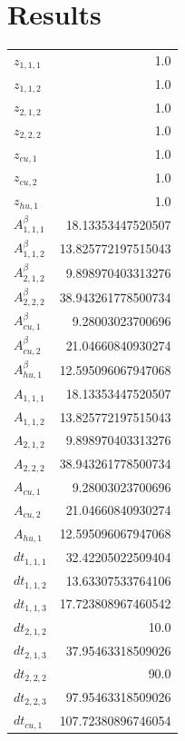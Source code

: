 \documentclass{article}%
\makeatletter
\let\mcnewpage=\newpage%
\newcommand{\TrickSupertabularIntoMulticols}{%
\renewcommand\newpage{%
\if@firstcolumn%
\hrule width\linewidth height0pt%
\columnbreak%
\else%
\mcnewpage%
\fi%
}%
}%
\makeatother
\begin{document}
\section{Results}%
\thispagestyle{plain}%
\begin{multicols*}{3}%
\TrickSupertabularIntoMulticols%
%
\begin{supertabular}{lr}%
	$z_{1,1,1}$ & 1.0 \\%
	$z_{1,1,2}$ & 1.0 \\%
	$z_{2,1,2}$ & 1.0 \\%
	$z_{2,2,2}$ & 1.0 \\%
	$z_{cu,1}$ & 1.0 \\%
	$z_{cu,2}$ & 1.0 \\%
	$z_{hu,1}$ & 1.0 \\%
	$A_{1,1,1}^{\beta}$ & 18.13353447520507 \\%
	$A_{1,1,2}^{\beta}$ & 13.825772197515043 \\%
	$A_{2,1,2}^{\beta}$ & 9.898970403313276 \\%
	$A_{2,2,2}^{\beta}$ & 38.943261778500734 \\%
	$A_{cu,1}^{\beta}$ & 9.28003023700696 \\%
	$A_{cu,2}^{\beta}$ & 21.04660840930274 \\%
	$A_{hu,1}^{\beta}$ & 12.595096067947068 \\%
	$A_{1,1,1}$ & 18.13353447520507 \\%
	$A_{1,1,2}$ & 13.825772197515043 \\%
	$A_{2,1,2}$ & 9.898970403313276 \\%
	$A_{2,2,2}$ & 38.943261778500734 \\%
	$A_{cu,1}$ & 9.28003023700696 \\%
	$A_{cu,2}$ & 21.04660840930274 \\%
	$A_{hu,1}$ & 12.595096067947068 \\%
	$dt_{1,1,1}$ & 32.42205022509404 \\%
	$dt_{1,1,2}$ & 13.63307533764106 \\%
	$dt_{1,1,3}$ & 17.723808967460542 \\%
	$dt_{2,1,2}$ & 10.0 \\%
	$dt_{2,1,3}$ & 37.95463318509026 \\%
	$dt_{2,2,2}$ & 90.0 \\%
	$dt_{2,2,3}$ & 97.95463318509026 \\%
	$dt_{cu,1}$ & 107.72380896746054 \\%

\end{supertabular}
\end{multicols*}
\end{document}
